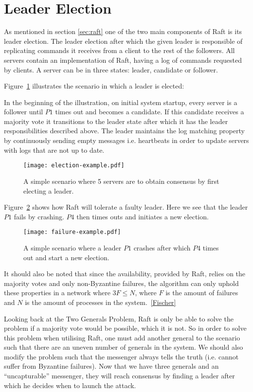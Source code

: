 \section{Leader Election} %
\label{sec:leader_election}
As mentioned in section \ref{sec:raft} one of the two main components of Raft is its leader election. The leader election after which the given leader is responsible of replicating commands it receives from a client to the rest of the followers. All servers contain an implementation of Raft, having a log of commands requested by clients. A server can be in three states: leader, candidate or follower.

Figure~\ref{fig:election_example} illustrates the scenario in which a leader is elected:

In the beginning of the illustration, on initial system startup, every server is a follower until $P1$ times out and becomes a candidate. If this candidate receives a majority vote it transitions to the leader state after which it has the leader responsibilities described above. The leader maintains the log matching property by continuously sending empty messages i.e. heartbeats in order to update servers with logs that are not up to date.

\begin{figure}[ht!]
\centering
\texttt{[image: election-example.pdf]}
\caption{A simple scenario where 5 servers are to obtain consensus by first electing a leader.}
\label{fig:election_example}
\end{figure}

Figure~\ref{fig:failure_example} shows how Raft will tolerate a faulty leader. Here we see that the leader $P1$ fails by crashing. $P4$ then times outs and initiates a new election.

\begin{figure}[ht!]
\centering
\texttt{[image: failure-example.pdf]}
\caption{A simple scenario where a leader $P1$ crashes after which $P4$ times out and start a new election.}
\label{fig:failure_example}
\end{figure}

It should also be noted that since the availability, provided by Raft, relies on the majority votes and only non-Byzantine failures, the algorithm can only uphold these properties in a network where $3F \leq N$, where $F$ is the amount of failures and $N$ is the amount of processes in the system.~\ref{Fischer}

Looking back at the Two Generals Problem, Raft is only be able to solve the problem if a majority vote would be possible, which it is not. So in order to solve this problem when utilising Raft, one must add another general to the scenario such that there are an uneven number of generals in the system. We should also modify the problem such that the messenger always tells the truth (i.e. cannot suffer from Byzantine failures). Now that we have three generals and an ``uncapturable'' messenger, they will reach consensus by finding a leader after which he decides when to launch the attack.

